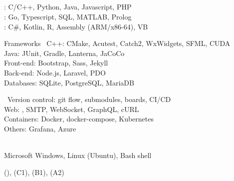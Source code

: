 \documentclass{cv}
\newif\ifen
\newif\ifpt
\newcommand{\en}[1]{\ifen#1\fi}
\newcommand{\pt}[1]{\ifpt#1\fi}
\begin{document}
\subsection*{\en{Skills}}\vspace{-1.5em}
\begin{multicols}{2}
    \begin{skills}{\en{Programming languages}}
        \en{Advanced}: C/C++, Python, Java, Javascript, PHP\\
        \en{Intermediate}: Go, Typescript, SQL, MATLAB, Prolog\\
        \en{Fundamental}: C\#, Kotlin, R, Assembly (ARM/x86-64), VB
    \end{skills}
    \begin{skills}{Frameworks}
        ~C++: CMake, Acutest, Catch2, WxWidgets, SFML, CUDA
        \\Java: JUnit, Gradle, Lanterna, JaCoCo
        \\Front-end: Bootstrap, Sass, Jekyll
        \\Back-end: Node.js, Laravel, PDO
        \\Databases: SQLite, PostgreSQL, MariaDB
    \end{skills}
    \begin{skills}{\en{Technologies}}
        ~Version control: git flow, submodules, boards, CI/CD
        \\Web: \en{async requests}, SMTP, WebSocket, GraphQL, cURL
        \\Containers: Docker, docker-compose, Kubernetes
        \\Others: Grafana, Azure
    \end{skills}
    \begin{skills}{\en{Other skills}}
        \en{Document elaboration in MS Word, LaTeX and Markdown}
        \\ Microsoft Windows, Linux (Ubuntu), Bash shell
    \end{skills}
    \begin{skills}{\en{Languages}}
        \en{Portuguese} (\en{native}), \en{English} (C1), \en{Spanish} (B1), \en{French} (A2)
    \end{skills}
\end{multicols} \vspace{-1.0em}
\end{document}
